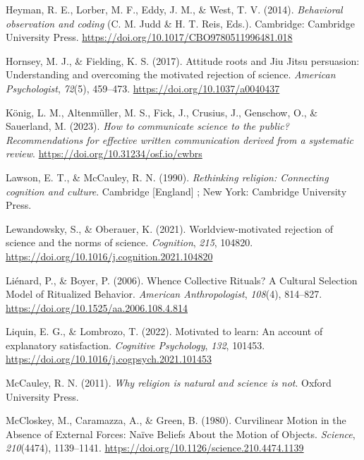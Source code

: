 \documentclass[
  english,
  doc,floatsintext]{apa6}
\newlength{\cslhangindent}
\newenvironment{CSLReferences}[2] %
 {\begin{list}{}{%
  \setlength{\itemindent}{0pt}
  \setlength{\leftmargin}{0pt}
  \setlength{\parsep}{0pt}
  \ifodd #1
   \setlength{\leftmargin}{\cslhangindent}
   \setlength{\itemindent}{-1\cslhangindent}
  \fi
  \setlength{\itemsep}{#2\baselineskip}}}
 {\end{list}}
\begin{document}
\begin{CSLReferences}{1}{0}
Heyman, R. E., Lorber, M. F., Eddy, J. M., \& West, T. V. (2014). \emph{Behavioral observation and coding} (C. M. Judd \& H. T. Reis, Eds.). Cambridge: Cambridge University Press. \url{https://doi.org/10.1017/CBO9780511996481.018}

Hornsey, M. J., \& Fielding, K. S. (2017). Attitude roots and Jiu Jitsu persuasion: Understanding and overcoming the motivated rejection of science. \emph{American Psychologist}, \emph{72}(5), 459--473. \url{https://doi.org/10.1037/a0040437}

König, L. M., Altenmüller, M. S., Fick, J., Crusius, J., Genschow, O., \& Sauerland, M. (2023). \emph{How to communicate science to the public? Recommendations for effective written communication derived from a systematic review}. \url{https://doi.org/10.31234/osf.io/cwbrs}

Lawson, E. T., \& McCauley, R. N. (1990). \emph{Rethinking religion: Connecting cognition and culture}. Cambridge {[}England{]} ; New York: Cambridge University Press.

Lewandowsky, S., \& Oberauer, K. (2021). Worldview-motivated rejection of science and the norms of science. \emph{Cognition}, \emph{215}, 104820. \url{https://doi.org/10.1016/j.cognition.2021.104820}

Liénard, P., \& Boyer, P. (2006). Whence Collective Rituals? A Cultural Selection Model of Ritualized Behavior. \emph{American Anthropologist}, \emph{108}(4), 814--827. \url{https://doi.org/10.1525/aa.2006.108.4.814}

Liquin, E. G., \& Lombrozo, T. (2022). Motivated to learn: An account of explanatory satisfaction. \emph{Cognitive Psychology}, \emph{132}, 101453. \url{https://doi.org/10.1016/j.cogpsych.2021.101453}

McCauley, R. N. (2011). \emph{Why religion is natural and science is not}. Oxford University Press.

McCloskey, M., Caramazza, A., \& Green, B. (1980). Curvilinear Motion in the Absence of External Forces: Naïve Beliefs About the Motion of Objects. \emph{Science}, \emph{210}(4474), 1139--1141. \url{https://doi.org/10.1126/science.210.4474.1139}


\end{CSLReferences}
\end{document}
